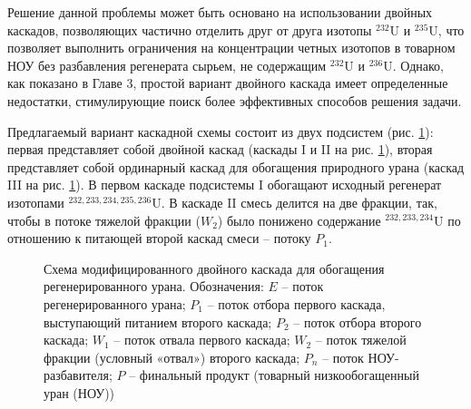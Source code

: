 Решение данной проблемы может быть основано на использовании двойных каскадов, позволяющих частично отделить друг от друга изотопы $^{232}$U и $^{235}$U, что позволяет выполнить ограничения на концентрации четных изотопов в товарном НОУ без разбавления регенерата сырьем, не содержащим $^{232}$U и $^{236}$U. Однако, как показано в Главе 3, простой вариант двойного каскада имеет определенные недостатки, стимулирующие поиск более эффективных способов решения задачи. 

Предлагаемый вариант каскадной схемы состоит из двух подсистем (рис. \ref{p2left}): первая представляет собой двойной каскад (каскады I и II на рис. \ref{p2left}), вторая представляет собой ординарный каскад для обогащения природного урана (каскад III на рис. \ref{p2left}). В первом каскаде подсистемы I обогащают исходный регенерат изотопами $^{232,233,234,235,236}$U. В каскаде II смесь делится на две фракции, так, чтобы в потоке тяжелой фракции ($W_2$) было понижено содержание $^{232,233,234}$U по отношению к питающей второй каскад смеси -- потоку $P_1$. 

\begin{figure}[ht]
    \caption{Схема модифицированного двойного каскада для обогащения регенерированного урана. Обозначения: $E$ -- поток регенерированного урана; $P_1$ -- поток отбора первого каскада, выступающий питанием второго каскада; $P_2$ -- поток отбора второго каскада; $W_1$ -- поток отвала первого каскада; $W_2$ -- поток тяжелой фракции (условный «отвал») второго каскада; $P_n$ -- поток НОУ-разбавителя; $P$ -- финальный продукт (товарный низкообогащенный уран (НОУ))}\label{p2left}
\end{figure}

